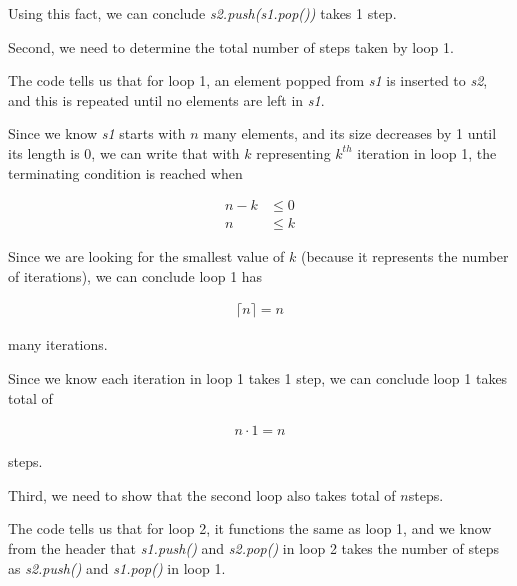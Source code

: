 \documentclass[12pt]{article}
\begin{document}
\begin{enumerate}[a.]
\begin{mdframed}
    Using this fact, we can conclude \textit{s2.push(s1.pop())} takes 1 step.

    \bigskip

    Second, we need to determine the total number of steps taken by loop 1.

    \bigskip

    The code tells us that for loop 1, an element popped from \textit{s1} is inserted to \textit{s2},
    and this is repeated until no elements are left in \textit{s1}.

    \bigskip

    Since we know \textit{s1} starts with $n$ many elements, and its size decreases
    by 1 until its length is 0, we can write that with $k$ representing
    $k^{th}$ iteration in loop 1, the terminating condition is reached when

    \setcounter{equation}{0}
    \begin{align}
        n - k &\leq 0\\
        n &\leq k
    \end{align}

    \bigskip

    Since we are looking for the smallest value of $k$ (because it represents
    the number of iterations), we can conclude loop 1 has

    \begin{align}
        \lceil n \rceil = n
    \end{align}

    many iterations.

    \bigskip

    Since we know each iteration in loop 1 takes 1 step, we can conclude
    loop 1 takes total of

    \begin{align}
        n \cdot 1 = n
    \end{align}

    steps.

    \bigskip

    Third, we need to show that the second loop also takes total of \color{red}$n$\color{black}\:steps.

    \bigskip
    \color{red}
    The code tells us that for loop 2, it functions the same as loop 1, and we
    know from the header that \textit{s1.push()} and \textit{s2.pop()} in loop 2
    takes the number of steps as \textit{s2.push()} and \textit{s1.pop()} in loop 1.

    \bigskip


\end{mdframed}
\end{enumerate}
\end{document}
